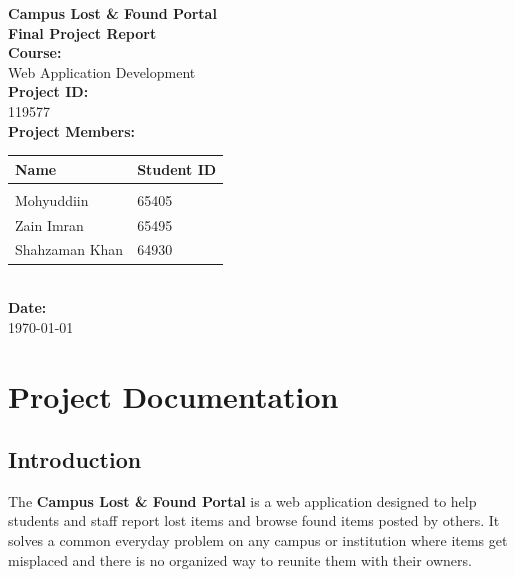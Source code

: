 \documentclass[12pt,a4paper]{report}
\begin{document}
\begin{titlepage}
    \centering
    \vspace*{2cm}
    
    {\Huge \textbf{Campus Lost \& Found Portal}}\\[0.5cm]
    {\LARGE \textbf{Final Project Report}}\\[2cm]
    
    {\Large \textbf{Course:}} \\ Web Application Development\\[0.5cm]
    
    {\Large \textbf{Project ID:}} \\ 119577\\[1.5cm]
    
    {\Large \textbf{Project Members:}}\\[0.5cm]
    \begin{tabular}{ll}
        \textbf{Name} & \textbf{Student ID} \\
        \hline \\[-0.8em]
        Mohyuddiin & 65405 \\
        Zain Imran & 65495 \\
        Shahzaman Khan & 64930 \\
    \end{tabular}\\[3cm]
    
    {\large \textbf{Date:}} \\ \today
    
    \vfill
\end{titlepage}

\tableofcontents
\newpage

\chapter{Project Documentation}

\section{Introduction}
The \textbf{Campus Lost \& Found Portal} is a web application designed to help students and staff report lost items and browse found items posted by others. It solves a common everyday problem on any campus or institution where items get misplaced and there is no organized way to reunite them with their owners. 
\end{document}
